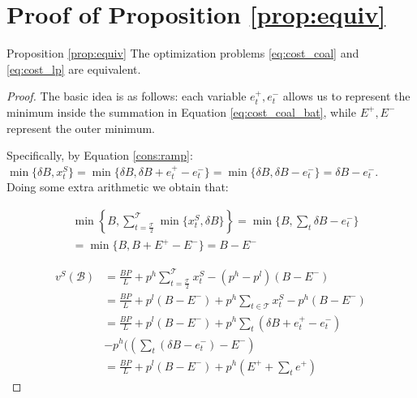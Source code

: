 \documentclass[sigconf, table]{acmart}
\newcommand{\Bat}{\mathcal{B}}
\newcommand{\Ep}{E^+}
\newcommand{\Ene}{E^-}
\newcommand{\ep}{e^+}
\newcommand{\ene}{e^-}
\newcommand{\pricelow}{p^l}
\newcommand{\pricehigh}{p^h}
\begin{document}
\section{Proof of Proposition \ref{prop:equiv}}\label{ap:equiv}

\begin{paragraph}{Proposition \ref{prop:equiv}}
The optimization problems \eqref{eq:cost_coal} and \eqref{eq:cost_lp} are equivalent.
\end{paragraph}


\begin{proof}
The basic idea is as follows: each variable $\ep_t, \ene_t$ allows us to represent the minimum inside the summation in Equation \eqref{eq:cost_coal_bat}, while $\Ep, \Ene$ represent the outer minimum.

Specifically, by Equation \eqref{cons:ramp}: $\min\{ \delta B, x^S_t \} = \min\{ \delta B, \delta B + \ep_t - \ene_t \} = \min\{ \delta B, \delta B - \ene_t \} = \delta B - \ene_t$. \\
Doing some extra arithmetic we obtain that:

\begin{equation*}
\begin{aligned}
&\min\left\{ B, \sum_{t=\frac{\mathcal{T}}{2}}^{\mathcal{{T}}} \min\{x^S_t, \delta B\} \right\} = \min\{ B, \sum_t \delta  B - \ene_t \}\\
&= \min\{ B, B + \Ep - \Ene\} = B - \Ene
\end{aligned}
\end{equation*}

\begin{equation}
    \begin{aligned}
      v^S(\Bat) &= \frac{BP}{L}   + p^ h\sum_{t=\frac{\mathcal{T}}{2}}^{\mathcal{{T}}} x^S_t 
  - (p^h -p^l)(B - \Ene)   \\
  &= \frac{BP}{L} + \pricelow (B - \Ene)   + p^ h\sum_{t \in \mathcal{T}} x^S_t - \pricehigh(B - \Ene) \\
  & = \frac{BP}{L} + \pricelow (B - \Ene) + \pricehigh \sum_t (\delta B + \ep_t - \ene_t) \\
  &- \pricehigh((\sum_t (\delta B - \ene_t) - \Ene) \\
  & =  \frac{BP}{L} + \pricelow (B - \Ene) + \pricehigh (\Ep + \sum_t \ep)
    \end{aligned}
\end{equation}

\end{proof}
\end{document}
